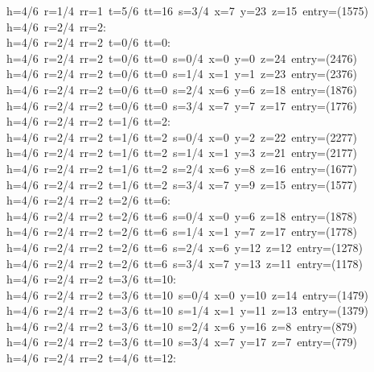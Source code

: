 \begin{tabbing}
h=4/6\ r=1/4\ rr=1\ t=5/6\ tt=16\ s=3/4\ x=7\ y=23\ z=15\ entry=(1575)\\[0pt]
h=4/6\ r=2/4\ rr=2:\\[0pt]
h=4/6\ r=2/4\ rr=2\ t=0/6\ tt=0:\\[0pt]
h=4/6\ r=2/4\ rr=2\ t=0/6\ tt=0\ s=0/4\ x=0\ y=0\ z=24\ entry=(2476)\\[0pt]
h=4/6\ r=2/4\ rr=2\ t=0/6\ tt=0\ s=1/4\ x=1\ y=1\ z=23\ entry=(2376)\\[0pt]
h=4/6\ r=2/4\ rr=2\ t=0/6\ tt=0\ s=2/4\ x=6\ y=6\ z=18\ entry=(1876)\\[0pt]
h=4/6\ r=2/4\ rr=2\ t=0/6\ tt=0\ s=3/4\ x=7\ y=7\ z=17\ entry=(1776)\\[0pt]
h=4/6\ r=2/4\ rr=2\ t=1/6\ tt=2:\\[0pt]
h=4/6\ r=2/4\ rr=2\ t=1/6\ tt=2\ s=0/4\ x=0\ y=2\ z=22\ entry=(2277)\\[0pt]
h=4/6\ r=2/4\ rr=2\ t=1/6\ tt=2\ s=1/4\ x=1\ y=3\ z=21\ entry=(2177)\\[0pt]
h=4/6\ r=2/4\ rr=2\ t=1/6\ tt=2\ s=2/4\ x=6\ y=8\ z=16\ entry=(1677)\\[0pt]
h=4/6\ r=2/4\ rr=2\ t=1/6\ tt=2\ s=3/4\ x=7\ y=9\ z=15\ entry=(1577)\\[0pt]
h=4/6\ r=2/4\ rr=2\ t=2/6\ tt=6:\\[0pt]
h=4/6\ r=2/4\ rr=2\ t=2/6\ tt=6\ s=0/4\ x=0\ y=6\ z=18\ entry=(1878)\\[0pt]
h=4/6\ r=2/4\ rr=2\ t=2/6\ tt=6\ s=1/4\ x=1\ y=7\ z=17\ entry=(1778)\\[0pt]
h=4/6\ r=2/4\ rr=2\ t=2/6\ tt=6\ s=2/4\ x=6\ y=12\ z=12\ entry=(1278)\\[0pt]
h=4/6\ r=2/4\ rr=2\ t=2/6\ tt=6\ s=3/4\ x=7\ y=13\ z=11\ entry=(1178)\\[0pt]
h=4/6\ r=2/4\ rr=2\ t=3/6\ tt=10:\\[0pt]
h=4/6\ r=2/4\ rr=2\ t=3/6\ tt=10\ s=0/4\ x=0\ y=10\ z=14\ entry=(1479)\\[0pt]
h=4/6\ r=2/4\ rr=2\ t=3/6\ tt=10\ s=1/4\ x=1\ y=11\ z=13\ entry=(1379)\\[0pt]
h=4/6\ r=2/4\ rr=2\ t=3/6\ tt=10\ s=2/4\ x=6\ y=16\ z=8\ entry=(879)\\[0pt]
h=4/6\ r=2/4\ rr=2\ t=3/6\ tt=10\ s=3/4\ x=7\ y=17\ z=7\ entry=(779)\\[0pt]
h=4/6\ r=2/4\ rr=2\ t=4/6\ tt=12:\\[0pt]

\end{tabbing}
